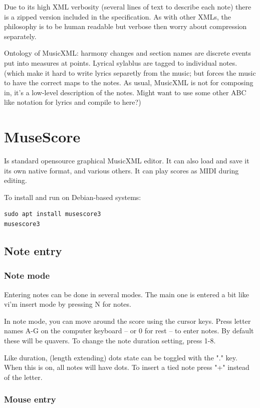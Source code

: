 \documentclass[oneside,english]{scrbook}
\begin{document}
Due to its high XML verbosity (several lines of text to describe each note) there is a zipped version included in the specification. As with other XMLs, the philosophy is to be human readable but verbose then worry about compression separately.

Ontology of MusicXML: harmony changes and section names are discrete events put into measures at points.  Lyrical sylablus are tagged to individual notes. (which make it hard to write lyrics separetly from the music; but forces the music to have the correct maps to the notes.  As usual, MusicXML is not for composing in, it's a low-level description of the notes. Might want to use some other ABC like notation for lyrics and compile to here?)

\section{MuseScore}
Is standard opensource graphical MusicXML editor. It can also load and save it its own native format, and various others.  It can play scores as MIDI during editing. 

To install and run on Debian-based systems:
\begin{verbatim}
sudo apt install musescore3
musescore3
\end{verbatim}

\subsection{Note entry}

\subsubsection{Note mode}
Entering notes can be done in several modes.  The main one is entered a bit like vi'm insert mode by pressing N for notes.

In note mode, you can move around the score using the cursor keys.   Press letter names A-G on the computer keyboard -- or 0 for rest -- to enter notes.   By default these will be quavers.  To change the note duration setting, press 1-8.

Like duration, (length extending) dots state can be toggled with the "." key.  When this is on, all notes will have dots.    To insert a tied note press "+" instead of the letter.

\subsubsection{Mouse entry}
\end{document}

